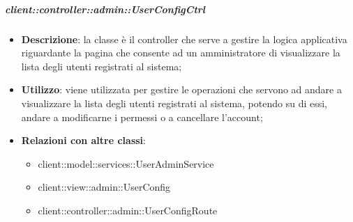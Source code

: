 		\subparagraph{client::controller::admin::UserConfigCtrl} %
		\label{subp:bdsm_app_client_controller_admin_userconfigctrl}
			\begin{itemize}
				\item \textbf{Descrizione}: la classe è il controller che serve a gestire la logica applicativa riguardante la pagina che consente ad un amministratore di visualizzare la lista degli utenti registrati al sistema;
				\item \textbf{Utilizzo}: viene utilizzata per gestire le operazioni che servono ad andare a visualizzare la lista degli utenti registrati al sistema, potendo su di essi, andare a modificarne i permessi o a cancellare l'account;
				\item \textbf{Relazioni con altre classi}:
					\begin{itemize}
						\item client::model::services::UserAdminService
						\item client::view::admin::UserConfig
						\item client::controller::admin::UserConfigRoute
					\end{itemize}
			\end{itemize}


